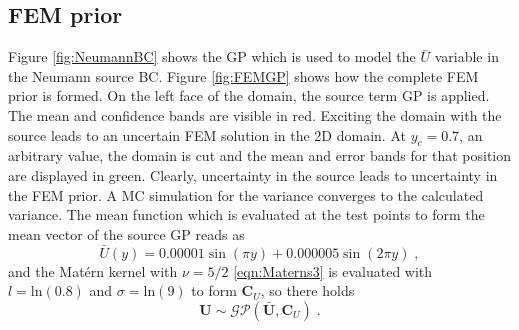 \documentclass[%
  a4paper,oneside,%
  11pt,%
  smallchapters,
  style=printdev,
  extramargin,
  green,%
  rgb, <cmyk>
  ]{tubsbook}
\begin{document}
\subsection{FEM prior}
\label{sec:2DFEMprior}
Figure \ref{fig:NeumannBC} shows the GP which is used to model the $\bar{U}$ variable in the Neumann source BC. Figure \ref{fig:FEMGP} shows how the complete FEM prior is formed. On the left face of the domain, the source term GP is applied. The mean and confidence bands are visible in red. Exciting the domain with the source leads to an uncertain FEM solution in the 2D domain. At $y_c = 0.7$, an arbitrary value, the domain is cut and the mean and error bands for that position are displayed in green. Clearly, uncertainty in the source leads to uncertainty in the FEM prior. A MC simulation for the variance converges to the calculated variance.
The mean function which is evaluated at the test points to form the mean vector of the source GP reads as
\begin{equation}
\bar{U}(y) = 0.00001 \sin(\pi y) + 0.000005 \sin(2\pi y) \;,
\end{equation}
and the Mat\'ern kernel with $\nu = 5/2$ \eqref{eqn:Materns3} is evaluated with $l = \mathrm{ln}(0.8)$ and $\sigma = \mathrm{ln}(9)$ to form $\bm{C}_U$, so there holds
\begin{equation}
\bm{U} \sim \mathcal{GP}(\bar{\bm{U}},\bm{C}_U) \;.
\end{equation}
\end{document}
